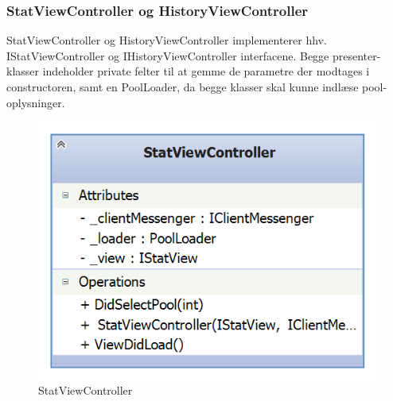 \subsubsection{StatViewController og HistoryViewController}
StatViewController og HistoryViewController implementerer hhv. IStatViewController og IHistoryViewController interfacene. Begge presenter-klasser indeholder private felter til at gemme de parametre der modtages i constructoren, samt en PoolLoader, da begge klasser skal kunne indlæse pool-oplysninger.

\begin{figure}
	\centering
	\includegraphics[width=0.3\linewidth]{figs/design/application_statviewcontroller}
	\caption{StatViewController}
	\label{fig:application_statviewcontroller}
\end{figure}